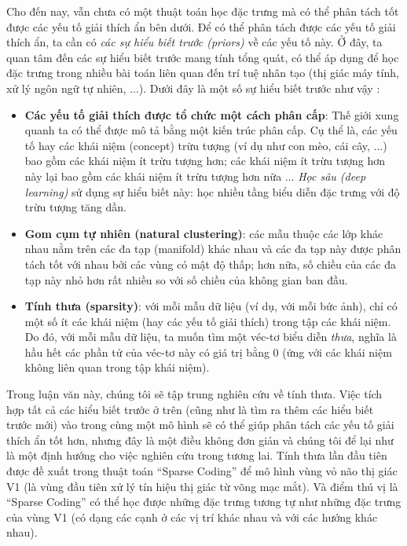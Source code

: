 Cho đến nay, vẫn chưa có một thuật toán học đặc trưng mà có thể phân tách tốt được các yếu tố giải thích ẩn bên dưới. Để có thể phân tách được các yếu tố giải thích ẩn, ta cần có \emph{các sự hiểu biết trước (priors)} về các yếu tố này. Ở đây, ta quan tâm đến các sự hiểu biết trước mang tính tổng quát, có thể áp dụng để học đặc trưng trong nhiều bài toán liên quan đến trí tuệ nhân tạo (thị giác máy tính, xử lý ngôn ngữ tự nhiên, ...). Dưới đây là một số sự hiểu biết trước như vậy \cite{bengio2013representation}:
\begin{itemize}
	\item \textbf{Các yếu tố giải thích được tổ chức một cách phân cấp}: Thế giới xung quanh ta có thể được mô tả bằng một kiến trúc phân cấp. Cụ thể là, các yếu tố hay các khái niệm (concept) trừu tượng (ví dụ như con mèo, cái cây, ...) bao gồm các khái niệm ít trừu tượng hơn; các khái niệm ít trừu tượng hơn này lại bao gồm các khái niệm ít trừu tượng hơn nữa ... \emph{Học sâu (deep learning)} sử dụng sự hiểu biết này: học nhiều tầng biểu diễn đặc trưng với độ trừu tượng tăng dần.
	\item \textbf{Gom cụm tự nhiên (natural clustering)}: các mẫu thuộc các lớp khác nhau nằm trên các đa tạp (manifold) khác nhau và các đa tạp này được phân tách tốt với nhau bởi các vùng có mật độ thấp; hơn nữa, số chiều của các đa tạp này nhỏ hơn rất nhiều so với số chiều của không gian ban đầu.
	\item \textbf{Tính thưa (sparsity)}: với mỗi mẫu dữ liệu (ví dụ, với mỗi bức ảnh), chỉ có một số ít các khái niệm (hay các yếu tố giải thích) trong tập các khái niệm. Do đó, với mỗi mẫu dữ liệu, ta muốn tìm một véc-tơ biểu diễn \emph{thưa}, nghĩa là hầu hết các phần tử của véc-tơ này có giá trị bằng 0 (ứng với các khái niệm không liên quan trong tập khái niệm).
\end{itemize}

Trong luận văn này, chúng tôi sẽ tập trung nghiên cứu về tính thưa. Việc tích hợp tất cả các hiểu biết trước ở trên (cũng như là tìm ra thêm các hiểu biết trước mới) vào trong cùng một mô hình sẽ có thể giúp phân tách các yếu tố giải thích ẩn tốt hơn, nhưng đây là một điều không đơn giản và chúng tôi để lại như là một định hướng cho việc nghiên cứu trong tương lai. Tính thưa lần đầu tiên được đề xuất trong thuật toán ``Sparse Coding'' \cite{olshausen1996emergence} để mô hình vùng vỏ não thị giác V1 (là vùng đầu tiên xử lý tín hiệu thị giác từ võng mạc mắt). Và điểm thú vị là ``Sparse Coding'' có thể học được những đặc trưng tương tự như những đặc trưng của vùng V1 (có dạng các cạnh ở các vị trí khác nhau và với các hướng khác nhau).

